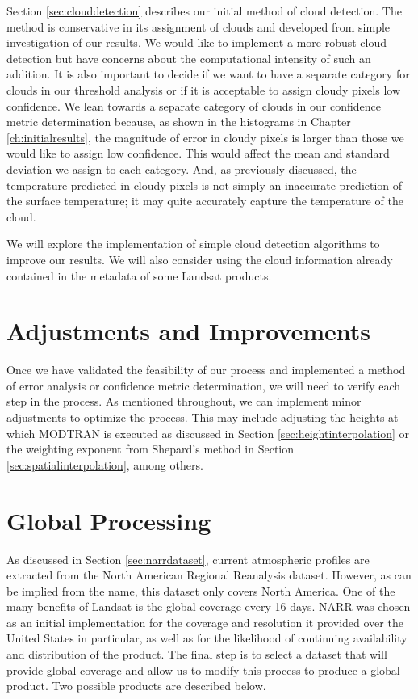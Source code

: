 \documentclass{book}
\begin{document}
Section \ref{sec:clouddetection} describes our initial method of cloud detection.  The method is conservative in its assignment of clouds and developed from simple investigation of our results.  We would like to implement a more robust cloud detection but have concerns about the computational intensity of such an addition.  It is also important to decide if we want to have a separate category for clouds in our threshold analysis or if it is acceptable to assign cloudy pixels low confidence.  We lean towards a separate category of clouds in our confidence metric determination because, as shown in the histograms in Chapter \ref{ch:initialresults}, the magnitude of error in cloudy pixels is larger than those we would like to assign low confidence.  This would affect the mean and standard deviation we assign to each category.  And, as previously discussed, the temperature predicted in cloudy pixels is not simply an inaccurate prediction of the surface temperature; it may quite accurately capture the temperature of the cloud.

We will explore the implementation of simple cloud detection algorithms to improve our results.  We will also consider using the cloud information already contained in the metadata of some Landsat products.

\section{Adjustments and Improvements}
\label{sec:adjustments}

Once we have validated the feasibility of our process and implemented a method of error analysis or confidence metric determination, we will need to verify each step in the process.  As mentioned throughout, we can implement minor adjustments to optimize the process.  This may include adjusting the heights at which MODTRAN is executed as discussed in Section \ref{sec:heightinterpolation} or the weighting exponent from Shepard's method in Section \ref{sec:spatialinterpolation}, among others.

\section{Global Processing}
\label{sec:globalprocessing}

As discussed in Section \ref{sec:narrdataset}, current atmospheric profiles are extracted from the North American Regional Reanalysis dataset.  However, as can be implied from the name, this dataset only covers North America.  One of the many benefits of Landsat is the global coverage every 16 days.  NARR was chosen as an initial implementation for the coverage and resolution it provided over the United States in particular, as well as for the likelihood of continuing availability and distribution of the product.  The final step is to select a dataset that will provide global coverage and allow us to modify this process to produce a global product.  Two possible products are described below.
\end{document}

